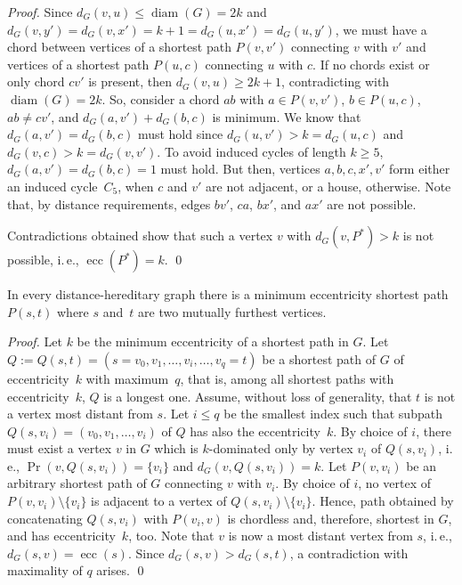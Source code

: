 \documentclass[10pt]{llncs}
\makeatletter
\newcommand{\ie}{i.\,e.\@ifnextchar{,}{}{~}}
\DeclareMathOperator{\ecc}{ecc}
\DeclareMathOperator{\diam}{diam}
\makeatother
\begin{document}
\begin{proof}
Since $d_G(v,u) \leq \diam(G) = 2k$ and $d_G(v,y') = d_G(v,x') = k + 1 = d_G(u,x') = d_G(u,y')$, we must have a chord between vertices of a shortest path $P(v,v')$ connecting $v$ with $v'$ and vertices of a shortest path $P(u,c)$ connecting $u$ with $c$. 
If no chords exist or only chord $cv'$ is present, then $d_G(v,u)\geq 2k+1$, contradicting with $\diam(G) = 2k$. 
So, consider a chord $ab$ with $a \in P(v,v')$, $b \in P(u,c)$, $ab \neq cv'$, and $d_G(a,v') + d_G(b,c)$ is minimum. 
We know that $d_G(a,v') = d_G(b,c)$ must hold since $d_G(u,v') > k = d_G(u,c)$ and $d_G(v,c) > k = d_G(v,v')$.
To avoid induced cycles of length $k \geq 5$, $d_G(a,v') = d_G(b,c) = 1$ must hold.
But then, vertices $a,b,c,x',v'$ form either an induced cycle~$C_5$, when $c$ and $v'$ are not adjacent, or a house, otherwise.
Note that, by distance requirements, edges $bv'$, $ca$, $bx'$, and $ax'$ are not possible. 

Contradictions obtained show that such a vertex $v$ with $d_G(v,P^*) > k$ is not possible, \ie, $\ecc(P^*) = k$. 
\qed
\end{proof}

\begin{lemma}
    \label{lm:mf} 
In every distance-hereditary graph there is a minimum eccentricity shortest path $P(s,t)$ where $s$ and~$t$ are two mutually furthest vertices. 
\end{lemma}

\begin{proof} 
Let $k$ be the minimum eccentricity of a shortest path in $G$. 
Let $Q := Q(s,t) = (s = v_0, v_1, \ldots, v_i, \ldots, v_q = t)$ be a shortest path of $G$ of eccentricity~$k$ with maximum~$q$, that is, among all shortest paths with eccentricity~$k$, $Q$ is a longest one. 
Assume, without loss of generality, that $t$ is not a vertex most distant from $s$. 
Let $i \leq q$ be the smallest index such that subpath $Q(s,v_i) = (v_0, v_1, \ldots, v_i)$ of $Q$ has also the eccentricity~$k$. 
By choice of $i$, there must exist a vertex $v$ in $G$ which is $k$-dominated only by vertex $v_i$ of $Q(s,v_i)$, \ie, $\Pr(v,Q(s,v_i)) = \{ v_i \}$ and $d_G(v,Q(s,v_i)) = k$. 
Let $P(v,v_i)$ be an arbitrary shortest path of $G$ connecting $v$ with $v_i$.
By choice of $i$, no vertex of $P(v,v_i) \setminus \{ v_i \}$ is adjacent to a vertex of $Q(s,v_i) \setminus \{ v_i \}$. 
Hence, path obtained by concatenating $Q(s,v_i)$ with $P(v_i,v)$ is chordless and, therefore, shortest in $G$, and has eccentricity~$k$, too. 
Note that $v$ is now a most distant vertex from $s$, \ie, $d_G(s,v) = \ecc(s)$. 
Since $d_G(s,v) > d_G(s,t)$, a contradiction with maximality of $q$ arises. 
\qed
\end{proof}
\end{document}
